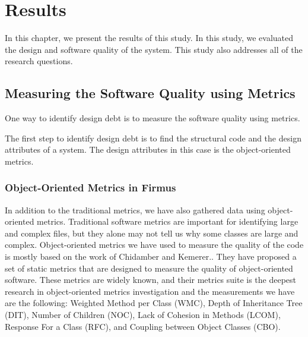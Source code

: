 
\chapter{Results}
In this chapter, we present the results of this study. 
In this study, we evaluated the design and software quality of the system. This study also addresses all of the research questions. 







\section{Measuring the Software Quality using Metrics}
One way to identify design debt is to measure the software quality using metrics. 

The first step to identify design debt is to find the structural code and the design attributes of a system. The design attributes in this case is the object-oriented metrics.








\subsection{Object-Oriented Metrics in Firmus}
In addition to the traditional metrics, we have also gathered data using object-oriented metrics. Traditional software metrics are important for identifying large and complex files, but they alone may not tell us why some classes are large and complex. Object-oriented metrics we have used to measure the quality of the code is mostly based on the work of Chidamber and Kemerer.\cite{chidamber1994metrics}. They have proposed a set of static metrics that are designed to measure the quality of object-oriented software. These metrics are widely known, and their metrics suite is the deepest research in object-oriented metrics investigation and the measurements we have are the following: Weighted Method per Class (WMC), Depth of Inheritance Tree (DIT), Number of Children (NOC), Lack of Cohesion in Methods (LCOM), Response For a Class (RFC), and Coupling between Object Classes (CBO). 


